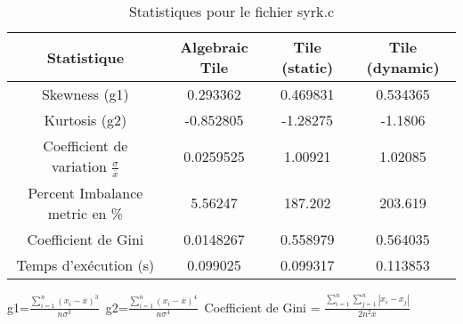 \documentclass{article}
\begin{document}
\begin{table}[htbp]
  \centering
  \caption{Statistiques pour le fichier syrk.c}
  \begin{tabular}{|c|c|c|c|}
    \hline
    Statistique & Algebraic Tile & Tile (static) & Tile (dynamic) \\ 
    \hline
    Skewness (g1)  & 0.293362 & 0.469831 & 0.534365 \\ 
    Kurtosis (g2)  & -0.852805 & -1.28275 & -1.1806 \\ 
    Coefficient de variation $ \frac{\sigma}{\overline{x}} $ & 0.0259525 & 1.00921 & 1.02085\\ 
    Percent Imbalance metric en \% & 5.56247 & 187.202 & 203.619\\ 
    Coefficient de Gini  & 0.0148267 & 0.558979 & 0.564035\\ 
    Temps d'exécution (s) &  0.099025    &  0.099317   &  0.113853   \\ 

    \hline
  \end{tabular}
\end{table}
g1=$ \frac{\sum_{i=1}^{n} (x_i - \overline{x})^3}{n\sigma^3} $\
g2=$ \frac{\sum_{i=1}^{n} (x_i - \overline{x})^4}{n\sigma^4} $\
Coefficient de Gini = $ \frac{\sum_{i=1}^{n}\sum_{j=1}^{n} |x_i - x_j|}{2n^2\overline{x}} $\
\newpage
\end{document}
